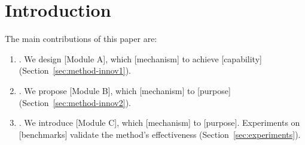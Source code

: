 \documentclass[journal,onecolumn,draftcls]{IEEEtran}
\begin{document}
\section{Introduction}
\label{sec:introduction}







The main contributions of this paper are:
\begin{enumerate}
  \item [Innovation 1 contribution]. We design [Module A], which [mechanism]
        to achieve [capability] (Section~\ref{sec:method-innov1}).
  \item [Innovation 2 contribution]. We propose [Module B], which [mechanism]
        to [purpose] (Section~\ref{sec:method-innov2}).
  \item [Innovation 3 contribution]. We introduce [Module C], which [mechanism]
        to [purpose]. Experiments on [benchmarks] validate the method's
        effectiveness (Section~\ref{sec:experiments}).
\end{enumerate}
\end{document}
